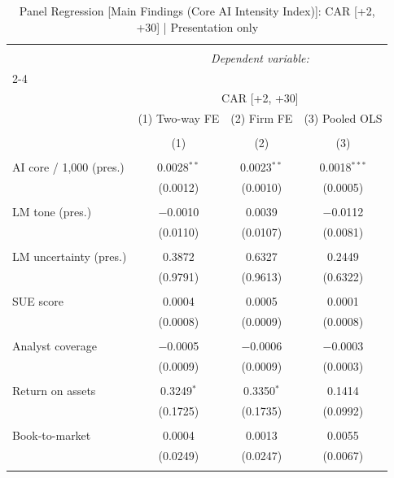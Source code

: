 
\begin{table}[!htbp] \centering 
  \caption{Panel Regression [Main Findings (Core AI Intensity Index)]: CAR [+2, +30]  |  Presentation only} 
  \label{} 
\begin{tabular}{@{\extracolsep{5pt}}lccc} 
\\[-1.8ex]\hline 
\hline \\[-1.8ex] 
 & \multicolumn{3}{c}{\textit{Dependent variable:}} \\ 
\cline{2-4} 
\\[-1.8ex] & \multicolumn{3}{c}{CAR [+2, +30]} \\ 
 & (1) Two-way FE & (2) Firm FE & (3) Pooled OLS \\ 
\\[-1.8ex] & (1) & (2) & (3)\\ 
\hline \\[-1.8ex] 
 AI core / 1,000 (pres.) & 0.0028$^{**}$ & 0.0023$^{**}$ & 0.0018$^{***}$ \\ 
  & (0.0012) & (0.0010) & (0.0005) \\ 
  & & & \\ 
 LM tone (pres.) & $-$0.0010 & 0.0039 & $-$0.0112 \\ 
  & (0.0110) & (0.0107) & (0.0081) \\ 
  & & & \\ 
 LM uncertainty (pres.) & 0.3872 & 0.6327 & 0.2449 \\ 
  & (0.9791) & (0.9613) & (0.6322) \\ 
  & & & \\ 
 SUE score & 0.0004 & 0.0005 & 0.0001 \\ 
  & (0.0008) & (0.0009) & (0.0008) \\ 
  & & & \\ 
 Analyst coverage & $-$0.0005 & $-$0.0006 & $-$0.0003 \\ 
  & (0.0009) & (0.0009) & (0.0003) \\ 
  & & & \\ 
 Return on assets & 0.3249$^{*}$ & 0.3350$^{*}$ & 0.1414 \\ 
  & (0.1725) & (0.1735) & (0.0992) \\ 
  & & & \\ 
 Book-to-market & 0.0004 & 0.0013 & 0.0055 \\ 
  & (0.0249) & (0.0247) & (0.0067) \\ 
  & & & \\ 

\end{tabular}
\end{table}
